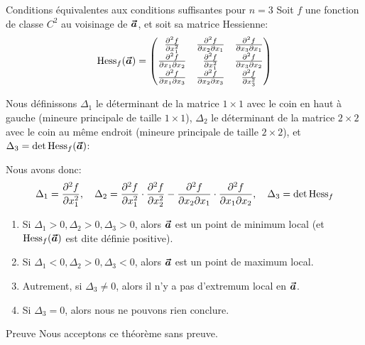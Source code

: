 \documentclass[a4paper]{article}
\begin{document}
\begin{parag}{Conditions équivalentes aux conditions suffisantes pour $n = 3$}
    Soit $f$ une fonction de classe $C^2$ au voisinage de $\bm{\protect\vec{a}}$, et soit sa matrice Hessienne: 
    \[\Hess_f\left(\bvec{a}\right) = \begin{pmatrix} \frac{\partial^{2} f}{\partial x_1^{2}} & \frac{\partial^2 f}{\partial x_2 \partial x_1} & \frac{\partial^2 f}{\partial x_3 \partial x_1} \\ \frac{\partial^2 f}{\partial x_1 \partial x_2} & \frac{\partial^{2} f}{\partial x_1^{2}} & \frac{\partial^2 f}{\partial x_3 \partial x_2} \\ \frac{\partial^2 f}{\partial x_1 \partial x_3} & \frac{\partial^2 f}{\partial x_2 \partial x_3} & \frac{\partial^{2} f}{\partial x_3^{2}} \end{pmatrix} \]
    
    Nous définissons $\Delta_1$ le déterminant de la matrice $1\times1$ avec le coin en haut à gauche (mineure principale de taille $1 \times 1$), $\Delta_2$ le déterminant de la matrice $2 \times 2$ avec le coin au même endroit (mineure principale de taille $2 \times 2$), et $\Delta_3 = \det\Hess_f\left(\bvec{a}\right)$:

    Nous avons donc:
    \[\Delta_1 = \frac{\partial^{2} f}{\partial x_1^{2}}, \quad \Delta_2 = \frac{\partial^{2} f}{\partial x_1^{2}} \cdot \frac{\partial^{2} f}{\partial x_2^{2}} - \frac{\partial^2 f}{\partial x_2 \partial x_1} \cdot \frac{\partial^2 f}{\partial x_1 \partial x_2}, \quad \Delta_3 = \det\operatorname{Hess}_f\]
    
    \begin{enumerate}[left=0pt]
        \item Si $\Delta_1 > 0, \Delta_2 > 0, \Delta_3 > 0$, alors $\bm{\protect\vec{a}}$ est un point de minimum local (et $\Hess_f\left(\bvec{a}\right)$ est dite définie positive).
        \item Si $\Delta_1 < 0, \Delta_2 > 0, \Delta_3 < 0$, alors $\bm{\protect\vec{a}}$ est un point de maximum local.
        \item Autrement, si $\Delta_3 \neq 0$, alors il n'y a pas d'extremum local en $\bm{\protect\vec{a}}$.
        \item Si $\Delta_3 = 0$, alors nous ne pouvons rien conclure.
    \end{enumerate}
    
    \begin{subparag}{Preuve}
        Nous acceptons ce théorème sans preuve.
    \end{subparag}
\end{parag}
\end{document}
